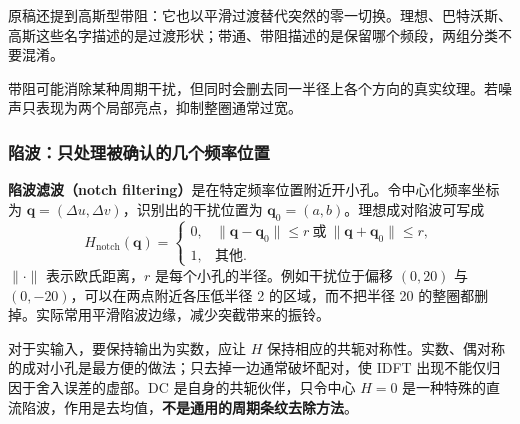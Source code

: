 原稿还提到高斯型带阻：它也以平滑过渡替代突然的零一切换。理想、巴特沃斯、高斯这些名字描述的是过渡形状；带通、带阻描述的是保留哪个频段，两组分类不要混淆。

带阻可能消除某种周期干扰，但同时会删去同一半径上各个方向的真实纹理。若噪声只表现为两个局部亮点，抑制整圈通常过宽。

\subsubsection{陷波：只处理被确认的几个频率位置}
\textbf{陷波滤波（notch filtering）}是在特定频率位置附近开小孔。令中心化频率坐标为 $\boldsymbol q=(\Delta u,\Delta v)$，识别出的干扰位置为 $\boldsymbol q_0=(a,b)$。理想成对陷波可写成
\[
H_{\mathrm{notch}}(\boldsymbol q)=
\begin{cases}
0,&\|\boldsymbol q-\boldsymbol q_0\|\leq r
\ \text{或}\ \|\boldsymbol q+\boldsymbol q_0\|\leq r,\\
1,&\text{其他}.
\end{cases}
\]
$\|\cdot\|$ 表示欧氏距离，$r$ 是每个小孔的半径。例如干扰位于偏移 $(0,20)$ 与 $(0,-20)$，可以在两点附近各压低半径 2 的区域，而不把半径 20 的整圈都删掉。实际常用平滑陷波边缘，减少突截带来的振铃。

\begin{center}
\end{center}

对于实输入，要保持输出为实数，应让 $H$ 保持相应的共轭对称性。实数、偶对称的成对小孔是最方便的做法；只去掉一边通常破坏配对，使 IDFT 出现不能仅归因于舍入误差的虚部。DC 是自身的共轭伙伴，只令中心 $H=0$ 是一种特殊的直流陷波，作用是去均值，\textbf{不是通用的周期条纹去除方法}。

